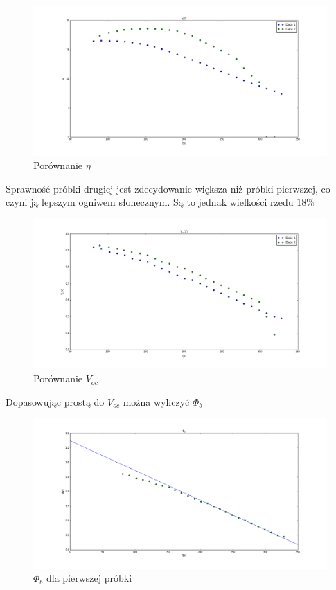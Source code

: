 \documentclass[a4paper,12pt]{article}
\begin{document}
\begin{figure} [H]
  \begin{center}
    \includegraphics[width = 15cm]{probki_porownanie_eta.png}
    \caption{Porównanie $\eta$}
  \end{center}
\end{figure}
Sprawność próbki drugiej jest zdecydowanie większa niż próbki pierwszej, co czyni ją lepszym ogniwem słonecznym. Są to jednak wielkości rzedu $18 \%$

\begin{figure} [H]
  \begin{center}
    \includegraphics[width = 15cm]{probki_porownanie_V_oc.png}
    \caption{Porównanie $V_{oc}$}
  \end{center}
\end{figure}





Dopasowując prostą do $V_{oc}$ można wyliczyć  $\Phi_b$
\begin{figure} [H]
  \begin{center}
    \includegraphics[width = 15cm]{probka1_phi_b.png}
    \caption{$\Phi_b$ dla pierwszej próbki}
  \end{center}
\end{figure}
\end{document}
